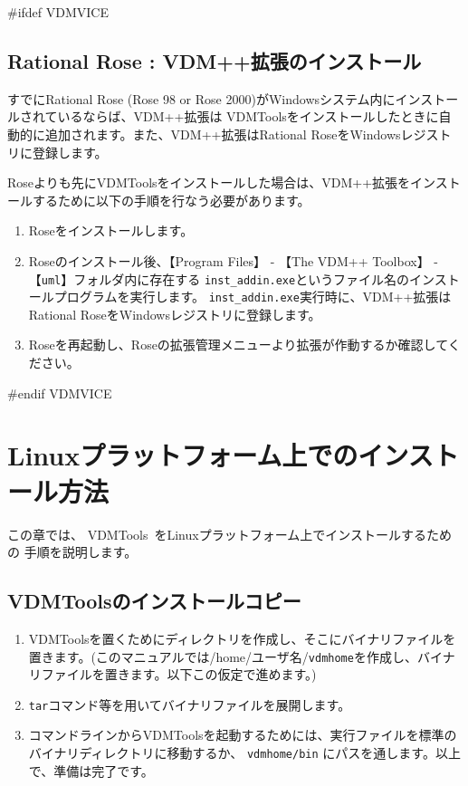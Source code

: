 \documentclass[\pformat,12pt]{jarticle}
\newcommand{\Toolbox}{VDMTools}
\newcommand{\vdmhome}{vdmhome}
\newcommand{\Toolbox}{VDMTools}
\newcommand{\vdmhome}{vpphome}
\newcommand{\Toolbox}{VDMTools}
\newcommand{\vdmhome}{vicehome}
\begin{document}
#ifdef VDMVICE
\subsection{Rational Rose : VDM++拡張のインストール}
すでにRational Rose (Rose 98 or Rose 2000)がWindowsシステム内にインストールされているならば、VDM++拡張は \Toolbox{}をインストールしたときに自動的に追加されます。また、VDM++拡張はRational RoseをWindowsレジストリに登録します。

Roseよりも先に\Toolbox{}をインストールした場合は、VDM++拡張をインストールするために以下の手順を行なう必要があります。

\begin{enumerate}
	\item Roseをインストールします。
	\item Roseのインストール後、【Program Files】 - 【The VDM++ Toolbox】 - 【{\tt uml}】フォルダ内に存在する
{\tt inst\_addin.exe}というファイル名のインストールプログラムを実行します。
{\tt inst\_addin.exe}実行時に、VDM++拡張はRational RoseをWindowsレジストリに登録します。
	\item Roseを再起動し、Roseの拡張管理メニューより拡張が作動するか確認してください。
\end{enumerate}
#endif VDMVICE


\newpage
\section{Linuxプラットフォーム上でのインストール方法}
この章では、 \Toolbox\ をLinuxプラットフォーム上でインストールするための
手順を説明します。

\subsection{VDMToolsのインストールコピー}\label{purchinstall}
\begin{enumerate}
	\item \Toolbox を置くためにディレクトリを作成し、そこにバイナリファイルを置きます。(このマニュアルでは/home/ユーザ名/{\tt \vdmhome}を作成し、バイナリファイルを置きます。以下この仮定で進めます。)
	\item {\tt tar}コマンド等を用いてバイナリファイルを展開します。
	\item コマンドラインからVDMToolsを起動するためには、実行ファイルを標準のバイナリディレクトリに移動するか、 {\tt \vdmhome/bin} にパスを通します。以上で、準備は完了です。
\end{enumerate}
\end{document}
